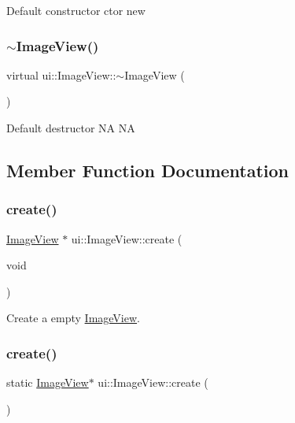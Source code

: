 Default constructor  ctor  new \mbox{\label{classui_1_1ImageView_a0e8c63d31b918dec30fed356130cf2bc}} 
\subsubsection{\texorpdfstring{$\sim$\+Image\+View()}{~ImageView()}\hspace{0.1cm}{\footnotesize\ttfamily [2/2]}}
{\footnotesize\ttfamily virtual ui\+::\+Image\+View\+::$\sim$\+Image\+View (\begin{DoxyParamCaption}{ }\end{DoxyParamCaption})\hspace{0.3cm}{\ttfamily [virtual]}}

Default destructor  NA  NA 

\subsection{Member Function Documentation}
\mbox{\label{classui_1_1ImageView_aa041d4f6eb4dd034fce0062344ed5957}} 
\subsubsection{\texorpdfstring{create()}{create()}\hspace{0.1cm}{\footnotesize\ttfamily [1/4]}}
{\footnotesize\ttfamily \hyperlink{classui_1_1ImageView}{Image\+View} $\ast$ ui\+::\+Image\+View\+::create (\begin{DoxyParamCaption}\item[{void}]{ }\end{DoxyParamCaption})\hspace{0.3cm}{\ttfamily [static]}}

Create a empty \hyperlink{classui_1_1ImageView}{Image\+View}. \mbox{\label{classui_1_1ImageView_a492e6b3f4897f31dfbe7dec0630a3570}} 
\subsubsection{\texorpdfstring{create()}{create()}\hspace{0.1cm}{\footnotesize\ttfamily [2/4]}}
{\footnotesize\ttfamily static \hyperlink{classui_1_1ImageView}{Image\+View}$\ast$ ui\+::\+Image\+View\+::create (\begin{DoxyParamCaption}{ }\end{DoxyParamCaption})\hspace{0.3cm}{\ttfamily [static]}}

